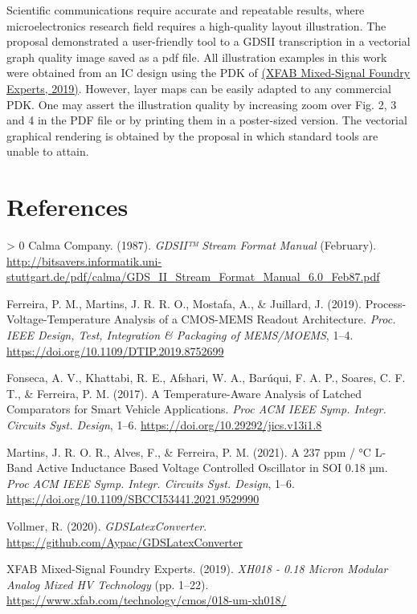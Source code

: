 \documentclass[10pt,a4paper,onecolumn]{article}
\let\textttOrig=\texttt
\def\texttt#1{\expandafter\textttOrig{\seqsplit{#1}}}
\newlength{\cslhangindent}
\newenvironment{CSLReferences}[3] %
 {%
  \setlength{\parindent}{0pt}
  \ifodd #1 \everypar{\setlength{\hangindent}{\cslhangindent}}\ignorespaces\fi
  \ifnum #2 > 0
  \setlength{\parskip}{#2\baselineskip}
  \fi
 }%
 {}
\let\addcontentslineOrig=\addcontentsline
\def\addcontentsline#1#2#3{\bgroup
  \let\texttt=\textttOrig\addcontentslineOrig{#1}{#2}{#3}\egroup}
\begin{document}
Scientific communications require accurate and repeatable results, where
microelectronics research field requires a high-quality layout
illustration. The proposal demonstrated a user-friendly tool to a GDSII
transcription in a vectorial graph quality image saved as a pdf file.
All illustration examples in this work were obtained from an IC design
using the PDK of \hyperlink{ref-XFAB2019}{(XFAB Mixed-Signal Foundry Experts, 2019)}. However,
layer maps can be easily adapted to any commercial PDK. One may assert
the illustration quality by increasing zoom over Fig. 2, 3 and 4 in the
PDF file or by printing them in a poster-sized version. The vectorial
graphical rendering is obtained by the proposal in which standard tools
are unable to attain.

\hypertarget{references}{%
\section*{References}\label{references}}

\hypertarget{refs}{}
\begin{CSLReferences}{1}{0}
\leavevmode\hypertarget{ref-Calma1987}{}%
Calma Company. (1987). \emph{{GDSII™  Stream Format Manual}} (February).
\url{http://bitsavers.informatik.uni-stuttgart.de/pdf/calma/GDS_II_Stream_Format_Manual_6.0_Feb87.pdf}

\leavevmode\hypertarget{ref-Ferreira2019b}{}%
Ferreira, P. M., Martins, J. R. R. O., Mostafa, A., \& Juillard, J.
(2019). {Process-Voltage-Temperature Analysis of a CMOS-MEMS Readout
Architecture}. \emph{Proc. IEEE Design, Test, Integration \& Packaging
of MEMS/MOEMS}, 1--4. \url{https://doi.org/10.1109/DTIP.2019.8752699}

\leavevmode\hypertarget{ref-Fonseca2017}{}%
Fonseca, A. V., Khattabi, R. E., Afshari, W. A., Barúqui, F. A. P.,
Soares, C. F. T., \& Ferreira, P. M. (2017). {A Temperature-Aware
Analysis of Latched Comparators for Smart Vehicle Applications}.
\emph{Proc ACM IEEE Symp. Integr. Circuits Syst. Design}, 1--6.
\url{https://doi.org/10.29292/jics.v13i1.8}

\leavevmode\hypertarget{ref-Martins2021}{}%
Martins, J. R. O. R., Alves, F., \& Ferreira, P. M. (2021). {A 237 ppm /
°C L-Band Active Inductance Based Voltage Controlled Oscillator in SOI
0.18 µm}. \emph{Proc ACM IEEE Symp. Integr. Circuits Syst. Design},
1--6. \url{https://doi.org/10.1109/SBCCI53441.2021.9529990}

\leavevmode\hypertarget{ref-Vollmer2020}{}%
Vollmer, R. (2020). \emph{{GDSLatexConverter}}.
\url{https://github.com/Aypac/GDSLatexConverter}

\leavevmode\hypertarget{ref-XFAB2019}{}%
XFAB Mixed-Signal Foundry Experts. (2019). \emph{{XH018 - 0.18 Micron
Modular Analog Mixed HV Technology}} (pp. 1--22).
\url{https://www.xfab.com/technology/cmos/018-um-xh018/}

\end{CSLReferences}
\end{document}
